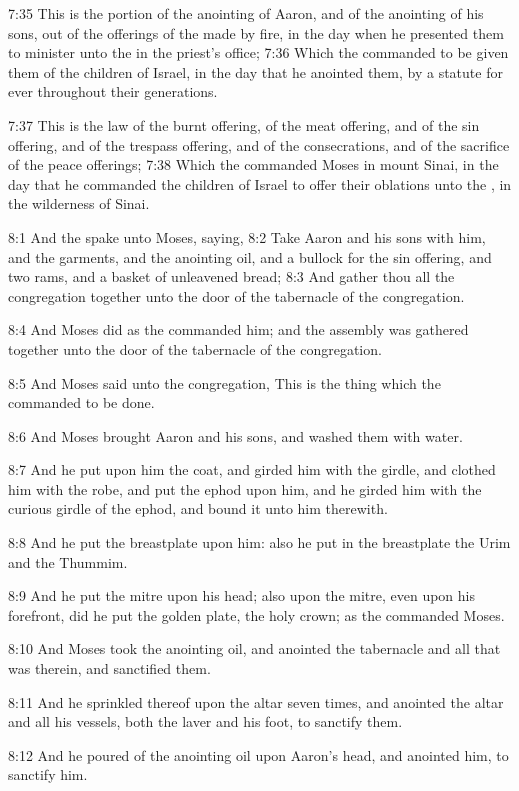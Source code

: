 7:35 This is the portion of the anointing of Aaron, and of the anointing of his sons, out of the offerings of the \LORD made by fire, in the day when he presented them to minister unto the \LORD in the priest's office; 7:36 Which the \LORD commanded to be given them of the children of Israel, in the day that he anointed them, by a statute for ever throughout their generations.

7:37 This is the law of the burnt offering, of the meat offering, and of the sin offering, and of the trespass offering, and of the consecrations, and of the sacrifice of the peace offerings; 7:38 Which the \LORD commanded Moses in mount Sinai, in the day that he commanded the children of Israel to offer their oblations unto the \LORD, in the wilderness of Sinai.

8:1 And the \LORD spake unto Moses, saying, 8:2 Take Aaron and his sons with him, and the garments, and the anointing oil, and a bullock for the sin offering, and two rams, and a basket of unleavened bread; 8:3 And gather thou all the congregation together unto the door of the tabernacle of the congregation.

8:4 And Moses did as the \LORD commanded him; and the assembly was gathered together unto the door of the tabernacle of the congregation.

8:5 And Moses said unto the congregation, This is the thing which the \LORD commanded to be done.

8:6 And Moses brought Aaron and his sons, and washed them with water.

8:7 And he put upon him the coat, and girded him with the girdle, and clothed him with the robe, and put the ephod upon him, and he girded him with the curious girdle of the ephod, and bound it unto him therewith.

8:8 And he put the breastplate upon him: also he put in the breastplate the Urim and the Thummim.

8:9 And he put the mitre upon his head; also upon the mitre, even upon his forefront, did he put the golden plate, the holy crown; as the \LORD commanded Moses.

8:10 And Moses took the anointing oil, and anointed the tabernacle and all that was therein, and sanctified them.

8:11 And he sprinkled thereof upon the altar seven times, and anointed the altar and all his vessels, both the laver and his foot, to sanctify them.

8:12 And he poured of the anointing oil upon Aaron's head, and anointed him, to sanctify him.


